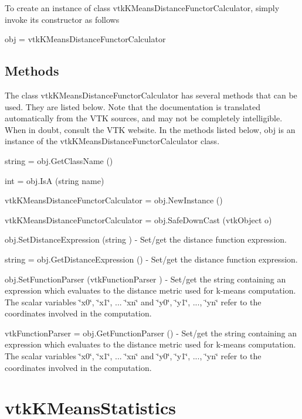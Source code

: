 To create an instance of class vtk\-K\-Means\-Distance\-Functor\-Calculator, simply invoke its constructor as follows \begin{DoxyVerb}  obj = vtkKMeansDistanceFunctorCalculator
\end{DoxyVerb}
 \hypertarget{vtkwidgets_vtkxyplotwidget_Methods}{}\subsection{Methods}\label{vtkwidgets_vtkxyplotwidget_Methods}
The class vtk\-K\-Means\-Distance\-Functor\-Calculator has several methods that can be used. They are listed below. Note that the documentation is translated automatically from the V\-T\-K sources, and may not be completely intelligible. When in doubt, consult the V\-T\-K website. In the methods listed below, {\ttfamily obj} is an instance of the vtk\-K\-Means\-Distance\-Functor\-Calculator class. 
\begin{DoxyItemize}
\item {\ttfamily string = obj.\-Get\-Class\-Name ()}  
\item {\ttfamily int = obj.\-Is\-A (string name)}  
\item {\ttfamily vtk\-K\-Means\-Distance\-Functor\-Calculator = obj.\-New\-Instance ()}  
\item {\ttfamily vtk\-K\-Means\-Distance\-Functor\-Calculator = obj.\-Safe\-Down\-Cast (vtk\-Object o)}  
\item {\ttfamily obj.\-Set\-Distance\-Expression (string )} -\/ Set/get the distance function expression.  
\item {\ttfamily string = obj.\-Get\-Distance\-Expression ()} -\/ Set/get the distance function expression.  
\item {\ttfamily obj.\-Set\-Function\-Parser (vtk\-Function\-Parser )} -\/ Set/get the string containing an expression which evaluates to the distance metric used for k-\/means computation. The scalar variables \char`\"{}x0\char`\"{}, \char`\"{}x1\char`\"{}, ... \char`\"{}xn\char`\"{} and \char`\"{}y0\char`\"{}, \char`\"{}y1\char`\"{}, ..., \char`\"{}yn\char`\"{} refer to the coordinates involved in the computation.  
\item {\ttfamily vtk\-Function\-Parser = obj.\-Get\-Function\-Parser ()} -\/ Set/get the string containing an expression which evaluates to the distance metric used for k-\/means computation. The scalar variables \char`\"{}x0\char`\"{}, \char`\"{}x1\char`\"{}, ... \char`\"{}xn\char`\"{} and \char`\"{}y0\char`\"{}, \char`\"{}y1\char`\"{}, ..., \char`\"{}yn\char`\"{} refer to the coordinates involved in the computation.  
\end{DoxyItemize}\hypertarget{vtkinfovis_vtkkmeansstatistics}{}\section{vtk\-K\-Means\-Statistics}\label{vtkinfovis_vtkkmeansstatistics}
